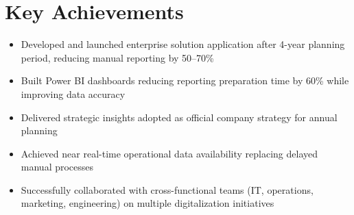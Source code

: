 \documentclass[a4paper,10pt]{article}
\begin{document}
\section*{Key Achievements}
\begin{itemize}
    \item Developed and launched enterprise solution application after 4-year planning period, reducing manual reporting by 50–70\%
    \item Built Power BI dashboards reducing reporting preparation time by 60\% while improving data accuracy
    \item Delivered strategic insights adopted as official company strategy for annual planning
    \item Achieved near real-time operational data availability replacing delayed manual processes
    \item Successfully collaborated with cross-functional teams (IT, operations, marketing, engineering) on multiple digitalization initiatives
\end{itemize}
\end{document}
